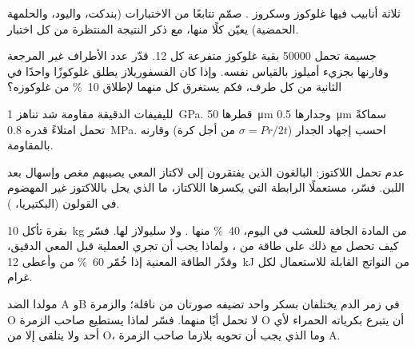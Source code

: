 \begin{exercise}[$\star\star$]\label{exo:b1:carbohydrates:6}
ثلاثة أنابيب فيها غلوكوز وسكروز . صمّم تتابعًا من الاختبارات
(بندكت، واليود، والحلمهة الحمضية) يعيّن كلًا منها، مع ذكر النتيجة
المنتظرة من كل اختبار.
\end{exercise}

\begin{exercise}[$\star\star$]\label{exo:b1:carbohydrates:7}
جسيمة  تحمل \num{50000} بقية غلوكوز متفرعة كل 12. قدّر عدد
الأطراف غير المرجعة وقارنها بجزيء أميلوز بالقياس نفسه. وإذا كان
الفسفوريلاز يطلق غلوكوزًا واحدًا في الثانية من كل طرف، فكم يستغرق كل
منهما لإطلاق \qty{10}{\%} من غلوكوزه؟
\end{exercise}

\begin{exercise}[$\star\star$]\label{exo:b1:carbohydrates:8}
لليفيفات  الدقيقة مقاومة شد تناهز \qty{1}{GPa}.  قطرها
\qty{50}{\micro m} وجدارها \qty{0.5}{\micro m} سماكةً تحمل امتلاءً
قدره \qty{0.8}{MPa}. احسب إجهاد الجدار ($\sigma = Pr/2t$ من أجل كرة)
وقارنه بالمقاومة.
\end{exercise}

\begin{exercise}[$\star\star$]\label{exo:b1:carbohydrates:9}
عدم تحمل اللاكتوز: البالغون الذين يفتقرون إلى لاكتاز المعي يصيبهم
مغص وإسهال بعد اللبن. فسّر، مستعملًا الرابطة التي يكسرها اللاكتاز،
ما الذي يحل باللاكتوز غير المهضوم في القولون (البكتيريا، ).
\end{exercise}

\begin{exercise}[$\star\star\star$]\label{exo:b1:carbohydrates:10}
بقرة تأكل \qty{10}{kg} من المادة الجافة للعشب في اليوم، \qty{40}{\%}
منها . ولا سليولاز لها. فسّر كيف تحصل مع ذلك على طاقة من
، ولماذا يجب أن تجري العملية قبل المعي الدقيق، وقدّر الطاقة
المعنية إذا خُمّر \qty{60}{\%} من  وأعطى \qty{12}{kJ} من
النواتج القابلة للاستعمال لكل غرام.
\end{exercise}

\begin{exercise}[$\star\star\star$]\label{exo:b1:carbohydrates:11}
مولدا الضد A وB في زمر الدم يختلفان بسكر واحد تضيفه صورتان من ناقلة؛
والزمرة O لا تحمل أيًا منهما. فسّر لماذا يستطيع صاحب الزمرة O أن
يتبرع بكرياته الحمراء لأي أحد ولا يتلقى إلا من O، وما الذي يجب أن
تحويه بلازما صاحب الزمرة A.
\end{exercise}

